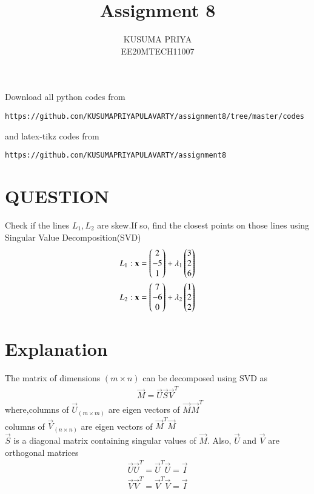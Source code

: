 \documentclass[journal,12pt,twocolumn]{IEEEtran}
\begin{document}
\renewcommand{\thefigure}{\theproblem}

\def\putbox#1#2#3{\makebox[0in][l]{\makebox[#1][l]{}\raisebox{\baselineskip}[0in][0in]{\raisebox{#2}[0in][0in]{#3}}}}
     \def\rightbox#1{\makebox[0in][r]{#1}}
     \def\centbox#1{\makebox[0in]{#1}}
     \def\topbox#1{\raisebox{-\baselineskip}[0in][0in]{#1}}
     \def\midbox#1{\raisebox{-0.5\baselineskip}[0in][0in]{#1}}
\vspace{3cm}
\title{Assignment 8}
\author{KUSUMA PRIYA\\EE20MTECH11007}

\maketitle
\newpage

\bigskip
\renewcommand{\thefigure}{\theenumi}
\renewcommand{\thetable}{\theenumi}
Download all python codes from 
\begin{lstlisting}
https://github.com/KUSUMAPRIYAPULAVARTY/assignment8/tree/master/codes
\end{lstlisting}
%
and latex-tikz codes from 
%
\begin{lstlisting}
https://github.com/KUSUMAPRIYAPULAVARTY/assignment8
\end{lstlisting}
%
 
 \section{QUESTION}
Check if the lines $L_1,L_2$ are skew.If so, find the closest points on those lines using Singular Value Decomposition(SVD)
\begin{align}
L_1: \mathbf{x}=\begin{pmatrix}2\\-5\\1\end{pmatrix}+\lambda_1\begin{pmatrix}3\\2\\6\end{pmatrix}\\
L_2: \mathbf{x}=\begin{pmatrix}7\\-6\\0\end{pmatrix}+\lambda_2\begin{pmatrix}1\\2\\2\end{pmatrix}
\end{align}

%
\section {Explanation}
The matrix  of dimensions $(m \times n)$ can be decomposed using SVD as 
\begin{align}
\vec{M}=\vec{U}\vec{S}\vec{V}^T\label{1}
\end{align}
where,columns of $\vec{U}_{(m \times m)}$ are eigen vectors of $\vec{M}\vec{M}^T$\\
columns of $\vec{V}_{(n \times n)}$ are eigen vectors of $\vec{M}^T\vec{M}$\\
$\vec{S}$ is a diagonal matrix containing singular values of $\vec{M}$. Also, $\vec{U}$ and $\vec{V}$ are orthogonal matrices
\begin{align}
    \vec{U}\vec{U}^T=\vec{U}^T\vec{U}=\vec{I}\\
     \vec{V}\vec{V}^T=\vec{V}^T\vec{V}=\vec{I}
\end{align}
\end{document}
